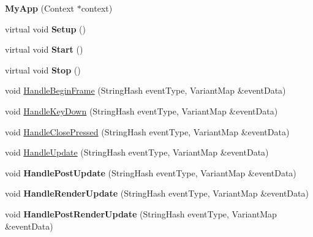 \begin{DoxyCompactItemize}
\item 
\mbox{\label{class_my_app_ae0005664d756c2dce1da3a3a4f508c35}} 
{\bfseries My\+App} (Context $\ast$context)
\item 
\mbox{\label{class_my_app_a4f987b5f077f9653d13e09b9250b7b7c}} 
virtual void {\bfseries Setup} ()
\item 
\mbox{\label{class_my_app_ab1f4e292d574e3dcef51cfdf1ea2d21b}} 
virtual void {\bfseries Start} ()
\item 
\mbox{\label{class_my_app_ae6e1f4f1e83b1b8ea6bb9eb36c38cc50}} 
virtual void {\bfseries Stop} ()
\item 
void \mbox{\hyperlink{class_my_app_a009ad0629cfb490636e2cf876c1c99cd}{Handle\+Begin\+Frame}} (String\+Hash event\+Type, Variant\+Map \&event\+Data)
\item 
void \mbox{\hyperlink{class_my_app_aef5d37aa52f53ea9c218ce6b21328068}{Handle\+Key\+Down}} (String\+Hash event\+Type, Variant\+Map \&event\+Data)
\item 
void \mbox{\hyperlink{class_my_app_a1c9c597a039a5c91da0c0b96fe64227c}{Handle\+Close\+Pressed}} (String\+Hash event\+Type, Variant\+Map \&event\+Data)
\item 
void \mbox{\hyperlink{class_my_app_abf4073723da0b7225df1b29d3fc085b1}{Handle\+Update}} (String\+Hash event\+Type, Variant\+Map \&event\+Data)
\item 
\mbox{\label{class_my_app_a86d17db079cc64c3c2f4c7a93b4df8ba}} 
void {\bfseries Handle\+Post\+Update} (String\+Hash event\+Type, Variant\+Map \&event\+Data)
\item 
\mbox{\label{class_my_app_a42d3cb621cafcd3248f0b5a94e81809e}} 
void {\bfseries Handle\+Render\+Update} (String\+Hash event\+Type, Variant\+Map \&event\+Data)
\item 
\mbox{\label{class_my_app_a61d8d8a736e8fa4b0ad5301a70a7712b}} 
void {\bfseries Handle\+Post\+Render\+Update} (String\+Hash event\+Type, Variant\+Map \&event\+Data)
\item 
\mbox{\label{class_my_app_ac5ffdb3c13635c101af711e901ca106a}} 

\end{DoxyCompactItemize}
